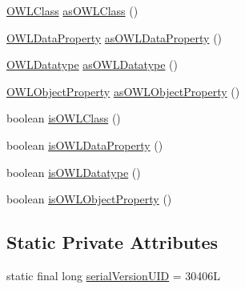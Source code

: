 \begin{DoxyCompactItemize}
\item 
\hyperlink{interfaceorg_1_1semanticweb_1_1owlapi_1_1model_1_1_o_w_l_class}{O\-W\-L\-Class} \hyperlink{classuk_1_1ac_1_1manchester_1_1cs_1_1owl_1_1owlapi_1_1_o_w_l_individual_impl_a1ee44ddbc6761065b83744187fbf9b0e}{as\-O\-W\-L\-Class} ()
\item 
\hyperlink{interfaceorg_1_1semanticweb_1_1owlapi_1_1model_1_1_o_w_l_data_property}{O\-W\-L\-Data\-Property} \hyperlink{classuk_1_1ac_1_1manchester_1_1cs_1_1owl_1_1owlapi_1_1_o_w_l_individual_impl_acdf66d9583965f7174b3a2bb1e98f62b}{as\-O\-W\-L\-Data\-Property} ()
\item 
\hyperlink{interfaceorg_1_1semanticweb_1_1owlapi_1_1model_1_1_o_w_l_datatype}{O\-W\-L\-Datatype} \hyperlink{classuk_1_1ac_1_1manchester_1_1cs_1_1owl_1_1owlapi_1_1_o_w_l_individual_impl_a6538cd8315a00f1eac593f666299b974}{as\-O\-W\-L\-Datatype} ()
\item 
\hyperlink{interfaceorg_1_1semanticweb_1_1owlapi_1_1model_1_1_o_w_l_object_property}{O\-W\-L\-Object\-Property} \hyperlink{classuk_1_1ac_1_1manchester_1_1cs_1_1owl_1_1owlapi_1_1_o_w_l_individual_impl_a07042feb6565628f56f8f6616150b3f8}{as\-O\-W\-L\-Object\-Property} ()
\item 
boolean \hyperlink{classuk_1_1ac_1_1manchester_1_1cs_1_1owl_1_1owlapi_1_1_o_w_l_individual_impl_a4b50fcde2469ffcbec0f5547239362e0}{is\-O\-W\-L\-Class} ()
\item 
boolean \hyperlink{classuk_1_1ac_1_1manchester_1_1cs_1_1owl_1_1owlapi_1_1_o_w_l_individual_impl_a9c2155e7fbbc2bc602529aac2dad3d5d}{is\-O\-W\-L\-Data\-Property} ()
\item 
boolean \hyperlink{classuk_1_1ac_1_1manchester_1_1cs_1_1owl_1_1owlapi_1_1_o_w_l_individual_impl_ae60b1501514c3e094a80092dae0589f7}{is\-O\-W\-L\-Datatype} ()
\item 
boolean \hyperlink{classuk_1_1ac_1_1manchester_1_1cs_1_1owl_1_1owlapi_1_1_o_w_l_individual_impl_a85dbd9a24922f02f097b65cb31705c67}{is\-O\-W\-L\-Object\-Property} ()
\end{DoxyCompactItemize}
\subsection*{Static Private Attributes}
\begin{DoxyCompactItemize}
\item 
static final long \hyperlink{classuk_1_1ac_1_1manchester_1_1cs_1_1owl_1_1owlapi_1_1_o_w_l_individual_impl_afd98bee2b4a7930fb1b6186b560a2183}{serial\-Version\-U\-I\-D} = 30406\-L
\end{DoxyCompactItemize}
